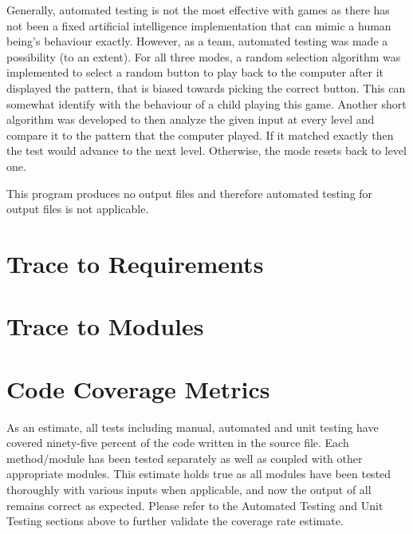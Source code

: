 \documentclass[12pt, titlepage]{article}
\begin{document}
\par Generally, automated testing is not the most effective with games as there has not been a fixed artificial intelligence implementation that can mimic a human being’s behaviour exactly. However, as a team, automated testing was made a possibility (to an extent). For all three modes, a random selection algorithm was implemented to select a random button to play back to the computer after it displayed the pattern, that is biased towards picking the correct button. This can somewhat identify with the behaviour of a child playing this game. Another short algorithm was developed to then analyze the given input at every level and compare it to the pattern that the computer played. If it matched exactly then the test would advance to the next level. Otherwise, the mode resets back to level one.
\\
\par This program produces no output files and therefore automated testing for output files is not applicable.

		
\section{Trace to Requirements}
		
\section{Trace to Modules}		

\section{Code Coverage Metrics}

\par As an estimate, all tests including manual, automated and unit testing have covered ninety-five percent of the code written in the source file. Each method/module has been tested separately as well as coupled with other appropriate modules. This estimate holds true as all modules have been tested thoroughly with various inputs when applicable, and now the output of all remains correct as expected. Please refer to the Automated Testing and Unit Testing sections above to further validate the coverage rate estimate.
\end{document}
